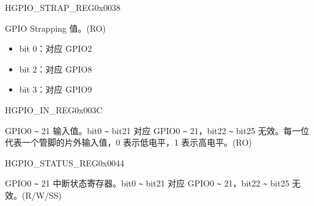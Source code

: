 \begin{register}{H}{GPIO\_STRAP\_REG}{0x0038}\label{regdesc:GPIOSTRAPREG}
%
%
\regnewline%
\begin{regdesc}\begin{reglist}
\label{fielddesc:GPIOSTRAPPING}\item [GPIO\_STRAPPING] GPIO Strapping 值。(RO)
\begin{itemize}
    \item bit 0：对应 GPIO2
    \item bit 2：对应 GPIO8
    \item bit 3：对应 GPIO9
\end{itemize}
\end{reglist}\end{regdesc}
\end{register}


\begin{register}{H}{GPIO\_IN\_REG}{0x003C}\label{regdesc:GPIOINREG}
%
%
\regnewline%
\begin{regdesc}\begin{reglist}
\label{fielddesc:GPIOINDATANEXT}\item [GPIO\_IN\_DATA\_NEXT] GPIO0 \verb+~+ 21 输入值。bit0 \verb+~+ bit21 对应 GPIO0 \verb+~+ 21，bit22 \verb+~+ bit25 无效。每一位代表一个管脚的片外输入值，0 表示低电平，1 表示高电平。(RO)
\end{reglist}\end{regdesc}
\end{register}


\begin{register}{H}{GPIO\_STATUS\_REG}{0x0044}\label{regdesc:GPIOSTATUSREG}
%
%
\regnewline%
\begin{regdesc}\begin{reglist}
\label{fielddesc:GPIOSTATUSINTERRUPT}\item [GPIO\_STATUS\_INTERRUPT] GPIO0 \verb+~+ 21 中断状态寄存器。bit0 \verb+~+ bit21 对应 GPIO0 \verb+~+ 21，bit22 \verb+~+ bit25 无效。(R/W/SS)
\end{reglist}\end{regdesc}
\end{register}


